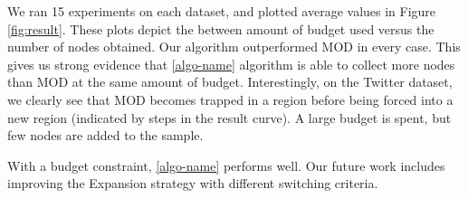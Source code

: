 We ran 15 experiments on each dataset, and plotted average values in Figure \ref{fig:result}. These plots depict the between amount of budget used versus the number of nodes obtained. Our algorithm outperformed MOD in every case. This gives us strong evidence that \ref{algo-name} algorithm is able to collect more nodes than MOD at the same amount of budget.  Interestingly, on the Twitter dataset, we clearly see that MOD becomes trapped in a region before being forced into a new region (indicated by steps in the result curve). A large budget is spent, but few nodes are added to the sample.

With a budget constraint, \ref{algo-name} performs well. Our future work includes improving the Expansion strategy with different switching criteria. 

